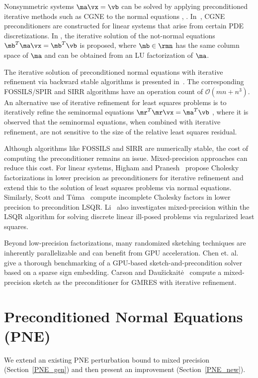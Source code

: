 \documentclass[final]{siamart220329}%
\begin{document}
Nonsymmetric systems $\ma\vx=\vb$ can be solved
by applying  preconditioned iterative methods such as CGNE to the normal equations
\cite[Section 11.3.9.]{GovL13}, \cite{PT2024}. In~\cite{LNZ2025}, CGNE preconditioners are constructed for
linear systems that arise from certain PDE discretizations.
In \cite{Wathennotnormal}, the iterative solution of the not-normal equations $\mb^T\ma\vx=\mb^T\vb$ is proposed, where $\mb\in\rmn$ has the same column space of $\ma$ and can be obtained from an LU factorization of $\ma$.

The iterative solution of preconditioned normal equations with iterative refinement via backward stable algorithms is
presented in~\cite{epperly2025fastrandomizedleastsquaressolvers,xu2024randomizediterativesolveriterative}. The corresponding
FOSSILS/SPIR and SIRR algorithms have an operation count of $\mathcal{O}( mn+ n^3)$.
 An alternative use of iterative refinement for least squares problems is to iteratively refine the seminormal equations $\mr^T\mr\vx=\ma^T\vb$ \cite{carson2025}, where it is observed  
that the seminormal equations, when combined with iterative refinement, are not sensitive to the size of the relative least squares residual.

Although algorithms like FOSSILS and SIRR are numerically stable, the cost of computing the preconditioner remains an issue. Mixed-precision approaches can reduce this cost. For linear systems, Higham and Pranesh~\cite{highampranesh} propose 
Cholesky factorizations in lower precision as  preconditioners for iterative refinement and extend this to the solution of least squares problems via normal equations. Similarly, Scott and T{\r u}ma~\cite{ScottTuma2025} compute incomplete Cholesky factors in lower precision to precondition LSQR. Li~\cite{Li_2024} also investigates mixed-precision within the LSQR algorithm for solving discrete linear ill-posed problems via regularized least squares.

Beyond low-precision factorizations, many randomized sketching techniques are inherently parallelizable and can benefit from GPU acceleration. Chen et. al.~\cite{chen2025gpuparallelizablerandomizedsketchandpreconditionlinear} give a thorough benchmarking of a GPU-based sketch-and-precondition solver based on a sparse sign embedding. Carson and Daužickaitė~\cite{carson2025mixedprecisionsketchingleastsquares} compute a mixed-precision sketch as the preconditioner for GMRES with iterative refinement. 

\section{Preconditioned Normal Equations (PNE)}\label{s_PNE}
We extend an existing PNE perturbation bound to mixed precision (Section~\ref{PNE_gen}) and then present an improvement (Section~\ref{PNE_new}).
\end{document}
